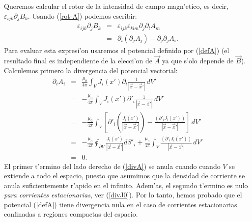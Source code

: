 Queremos calcular el rotor de la intensidad de campo magn'etico, es decir, $\varepsilon_{ijk}\partial_jB_k$. Usando (\ref{rot-A})
podemos escribir:
\begin{eqnarray}
 \varepsilon_{ijk}\partial_jB_k&=&\varepsilon_{ijk}\varepsilon_{
klm}\partial_j\partial_lA_m \\
&=&\partial_i(\partial_jA_j) -\partial_j\partial_jA_i. \label{rotB1}
\end{eqnarray}
Para evaluar esta expresi'on usaremos el potencial definido por (\ref{defA})
(el resultado final es independiente de la elecci'on de $\vec{A}$ ya que s'olo
depende de $\vec{B}$). Calculemos primero la divergencia del potencial
vectorial:
\begin{eqnarray}
\partial_iA_i&=&\frac{\mu_0}{4\pi}\int_VJ_i(x')\partial_i\frac{1}{\left\vert\vec
{x} -\vec{x}'\right\vert }\,dV' \\
&=& -\frac{\mu_0}{4\pi}\int_VJ_i(x')\partial'_i\frac{1}{\left\vert\vec{
x } -\vec{x}'\right\vert }\,dV' \\
&=&-\frac{\mu_0}{4\pi}\int_V\left[\partial'_i\left(\frac{J_i(x')}{
\left\vert\vec{x}-\vec{x}'\right\vert}\right)-\frac{
\left(\partial'_iJ_i(x')\right) } { \left\vert\vec{x} -\vec{x}'\right\vert
}\right]\,dV' \\
&=&-\frac{\mu_0}{4\pi}\oint_{\partial V}\frac{J_i(x')}{
\left\vert\vec{x}-\vec{x}'\right\vert}dS'_i+\frac{\mu_0}{4\pi}\int_V\frac{
\left(\partial'_iJ_i(x')\right) } {\left\vert\vec{x}
-\vec{x}'\right\vert}\,dV'  \label{divA} \\
&=&0. \label{divA0}
\end{eqnarray}
El primer t'ermino del lado derecho de (\ref{divA}) se anula cuando cuando $V$
se extiende a todo el espacio, puesto que asumimos que la densidad de corriente
se anula suficientemente r'apido en el infinito. Adem'as, el segundo t'ermino es nulo
\textit{para corrientes estacionarias}, ver (\ref{divJ0}). Por lo tanto, hemos probado
que el potencial (\ref{defA}) tiene divergencia nula en el caso de corrientes
estacionarias confinadas a regiones compactas del espacio.

